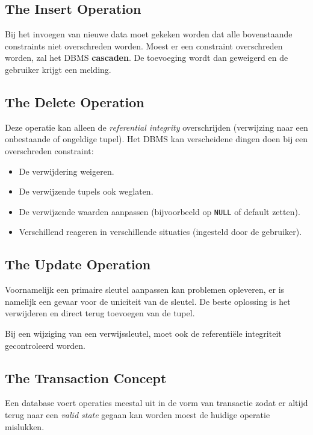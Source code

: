 \subsection{The Insert Operation}
Bij het invoegen van nieuwe data moet gekeken worden dat alle bovenstaande constraints niet overschreden worden. Moest er een constraint overschreden worden, zal het DBMS \textbf{cascaden}. De toevoeging wordt dan geweigerd en de gebruiker krijgt een melding.

\subsection{The Delete Operation}
Deze operatie kan alleen de \textit{referential integrity} overschrijden (verwijzing naar een onbestaande of ongeldige tupel). Het DBMS kan verscheidene dingen doen bij een overschreden constraint:
\begin{itemize}
	\item De verwijdering weigeren.
	\item De verwijzende tupels ook weglaten.
	\item De verwijzende waarden aanpassen (bijvoorbeeld op \texttt{NULL} of default zetten).
	\item Verschillend reageren in verschillende situaties (ingesteld door de gebruiker).
\end{itemize}

\subsection{The Update Operation}
Voornamelijk een primaire sleutel aanpassen kan problemen opleveren, er is namelijk een gevaar voor de uniciteit van de sleutel. De beste oplossing is het verwijderen en direct terug toevoegen van de tupel.

Bij een wijziging van een verwijssleutel, moet ook de referenti\"ele integriteit gecontroleerd worden.

\subsection{The Transaction Concept}
Een database voert operaties meestal uit in de vorm van transactie zodat er altijd terug naar een \textit{valid state} gegaan kan worden moest de huidige operatie mislukken.